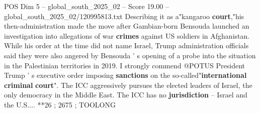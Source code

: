 \begin{textsample}{POS Dim 5 – global\_south\_2025\_02 – Score 19.00 – global\_south\_2025\_02/120995813.txt}
Describing it as a"kangaroo \textbf{court},"his then-administration made the move after Gambian-born Bensouda launched an investigation into allegations of war \textbf{crimes} against US soldiers in Afghanistan.
While his order at the time did not name Israel, Trump administration officials said they were also angered by Bensouda ' s opening of a probe into the situation in the Palestinian territories in 2019.
I strongly commend @POTUS President Trump ' s executive order imposing \textbf{sanctions} on the so-called"\textbf{international} \textbf{criminal} \textbf{court}".
The ICC aggressively pursues the elected leaders of Israel, the only democracy in the Middle East.
The ICC has no \textbf{jurisdiction} -- Israel and the U.S.... **26 ; 2675 ; TOOLONG

\end{textsample}

